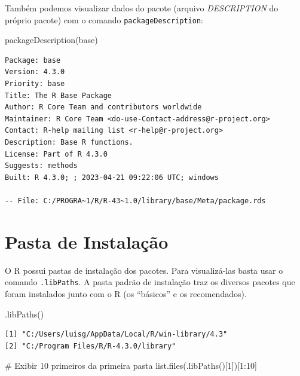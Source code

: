 \documentclass[
  letterpaper,
  DIV=11,
  numbers=noendperiod]{scrreprt}
\newenvironment{Shaded}{\begin{snugshade}}{\end{snugshade}}
\newcommand{\CommentTok}[1]{\textcolor[rgb]{0.37,0.37,0.37}{#1}}
\newcommand{\DecValTok}[1]{\textcolor[rgb]{0.68,0.00,0.00}{#1}}
\newcommand{\FunctionTok}[1]{\textcolor[rgb]{0.28,0.35,0.67}{#1}}
\newcommand{\NormalTok}[1]{\textcolor[rgb]{0.00,0.23,0.31}{#1}}
\newcommand{\SpecialCharTok}[1]{\textcolor[rgb]{0.37,0.37,0.37}{#1}}
\newcommand{\StringTok}[1]{\textcolor[rgb]{0.13,0.47,0.30}{#1}}
\begin{document}
Também podemos visualizar dados do pacote (arquivo \emph{DESCRIPTION} do
próprio pacote) com o comando \texttt{packageDescription}:

\begin{Shaded}
\begin{Highlighting}[]
\FunctionTok{packageDescription}\NormalTok{(}\StringTok{\textquotesingle{}base\textquotesingle{}}\NormalTok{)}
\end{Highlighting}
\end{Shaded}

\begin{verbatim}
Package: base
Version: 4.3.0
Priority: base
Title: The R Base Package
Author: R Core Team and contributors worldwide
Maintainer: R Core Team <do-use-Contact-address@r-project.org>
Contact: R-help mailing list <r-help@r-project.org>
Description: Base R functions.
License: Part of R 4.3.0
Suggests: methods
Built: R 4.3.0; ; 2023-04-21 09:22:06 UTC; windows

-- File: C:/PROGRA~1/R/R-43~1.0/library/base/Meta/package.rds 
\end{verbatim}

\hypertarget{pasta-de-instalauxe7uxe3o}{%
\section{Pasta de Instalação}\label{pasta-de-instalauxe7uxe3o}}

O R possui pastas de instalação dos pacotes. Para visualizá-las basta
usar o comando \texttt{.libPaths}. A pasta padrão de instalação traz os
diversos pacotes que foram instalados junto com o R (os ``básicos'' e os
recomendados).

\begin{Shaded}
\begin{Highlighting}[]
\FunctionTok{.libPaths}\NormalTok{()}
\end{Highlighting}
\end{Shaded}

\begin{verbatim}
[1] "C:/Users/luisg/AppData/Local/R/win-library/4.3"
[2] "C:/Program Files/R/R-4.3.0/library"            
\end{verbatim}

\begin{Shaded}
\begin{Highlighting}[]
\CommentTok{\# Exibir 10 primeiros da primeira pasta}
\FunctionTok{list.files}\NormalTok{(}\FunctionTok{.libPaths}\NormalTok{()[}\DecValTok{1}\NormalTok{])[}\DecValTok{1}\SpecialCharTok{:}\DecValTok{10}\NormalTok{]}
\end{Highlighting}
\end{Shaded}
\end{document}
